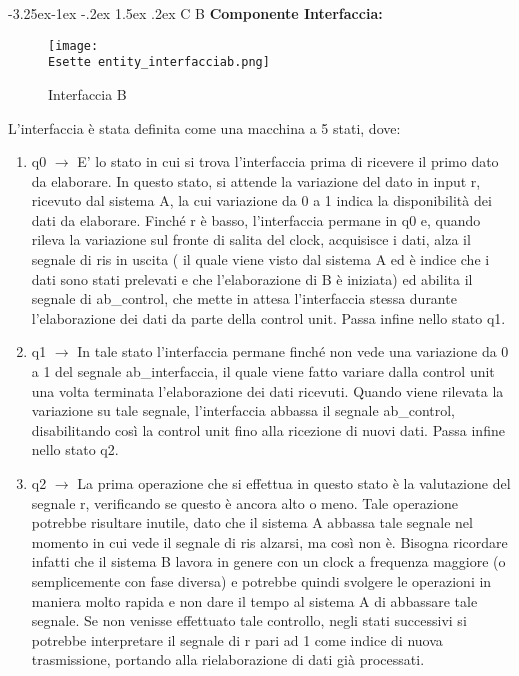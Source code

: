 \documentclass[12pt]{article}
\makeatletter
\renewcommand\subsubsection{\@startsection{subsubsection}{3}{\z@}%
            {-3.25ex\@plus -1ex \@minus -.2ex}%
            {1.5ex \@plus .2ex}%
            {\normalfont\large\bfseries}}
\def \Esette {Allegati/Esercizio7/}
\makeatother
\begin{document}
\subsubsection{C B}
{\large \textbf{Componente Interfaccia:}}
\begin{figure}[ht]
    \centering
    \texttt{[image: \\Esette entity\_interfacciab.png]}
    \caption{Interfaccia B}
\end{figure}
L’interfaccia è stata definita come una macchina a 5 stati, dove:
\begin{enumerate}
    \item q0 $\rightarrow$ E' lo stato in cui si trova l’interfaccia prima di ricevere il primo dato da elaborare. In questo stato, si attende la variazione del dato in input r, ricevuto dal sistema A, la cui variazione da 0 a 1 indica la disponibilità dei dati da elaborare. Finché r è basso, l’interfaccia permane in q0 e, quando rileva la variazione sul fronte di salita del clock, acquisisce i dati, alza il segnale di ris in uscita ( il quale viene visto dal sistema A ed è indice che i dati sono stati prelevati e che l’elaborazione di B è iniziata) ed abilita il segnale di ab\_control, che mette in attesa l’interfaccia stessa durante l’elaborazione dei dati da parte della control unit. Passa infine nello stato q1.
    \item q1 $\rightarrow$ In tale stato l’interfaccia permane finché non vede una variazione da 0 a 1 del segnale ab\_interfaccia, il quale viene fatto variare dalla control unit una volta terminata l’elaborazione dei dati ricevuti. Quando viene rilevata la variazione su tale segnale, l’interfaccia abbassa il segnale ab\_control, disabilitando così la control unit fino alla ricezione di nuovi dati. Passa infine nello stato q2.
    \item q2 $\rightarrow$ La prima operazione che si effettua in questo stato è la valutazione del segnale r, verificando se questo è ancora alto o meno. Tale operazione potrebbe risultare inutile, dato che il sistema A abbassa tale segnale nel momento in cui vede il segnale di ris alzarsi, ma così non è. Bisogna ricordare infatti che il sistema B lavora in genere con un clock a frequenza maggiore (o semplicemente con fase diversa) e potrebbe quindi svolgere le operazioni in maniera molto rapida e non dare il tempo al sistema A di abbassare tale segnale. Se non venisse effettuato tale controllo, negli stati successivi si potrebbe interpretare il segnale di r pari ad 1 come indice di nuova trasmissione, portando alla rielaborazione di dati già processati.

\end{enumerate}
\end{document}

